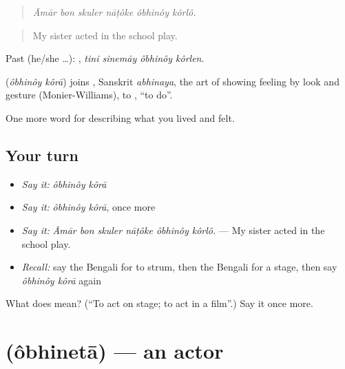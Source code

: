 \begin{quote}
\emph{Āmār bon skuler nāṭôke ôbhinôy kôrlô.}
\end{quote}

\begin{quote}
My sister acted in the school play.
\end{quote}

Past (he/she …):    , \emph{tini sinemāy ôbhinôy kôrlen}.

\begin{cousinweb}
\textbf{ } (\emph{ôbhinôy kôrā}) joins , Sanskrit \emph{abhinaya}, the art of showing feeling by look and gesture (Monier-Williams), to , \textquotedblleft{}to do\textquotedblright{}.
\end{cousinweb}

\begin{grammarlens}[title={What you've built}]
One more word for describing what you lived and felt.
\end{grammarlens}

\subsection*{Your turn}
\begin{itemize}
\raggedright
  \item \emph{Say it:} \emph{ôbhinôy kôrā}
  \item \emph{Say it:} \emph{ôbhinôy kôrā}, once more
  \item \emph{Say it:} \emph{Āmār bon skuler nāṭôke ôbhinôy kôrlô.} — My sister acted in the school play.
  \item \emph{Recall:} say the Bengali for to strum, then the Bengali for a stage, then say \emph{ôbhinôy kôrā} again
\end{itemize}

\begin{tcolorbox}[breakable,colback=teal!4,colframe=teal!35!black,title={Before you move on}]
What does   mean? (\textquotedblleft{}To act on stage; to act in a film\textquotedblright{}.) Say it once more.
\end{tcolorbox}
\section[\texorpdfstring{\bn{অভিনেতা} (ôbhinetā)}{অভিনেতা (ôbhinetā)}]{ (ôbhinetā) — an actor}

\label{lesson:BN-C527-obhineta}



